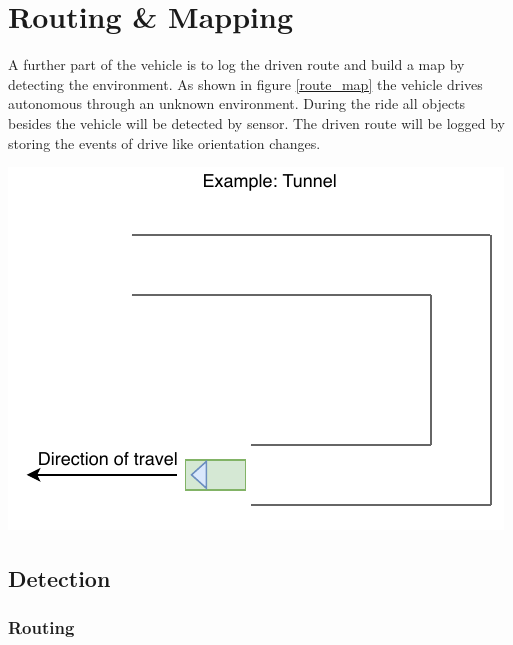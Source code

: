 \newpage

\section{Routing \& Mapping}

A further part of the vehicle is to log the driven route and build a map by detecting the environment.
As shown in figure \ref{route_map} the vehicle drives autonomous through an unknown environment. During the
ride all objects besides the vehicle will be detected by sensor. The driven route will be logged by
storing the events of drive like orientation changes.\\
\begin{center}
\begin{minipage}{0.45\textwidth}
\label{route_map}
\includegraphics[page=3,scale=1]{sources/mapping/example_tunnel.pdf}
\end{minipage}
\end{center}

\subsection{Detection}

\subsubsection{Routing}

